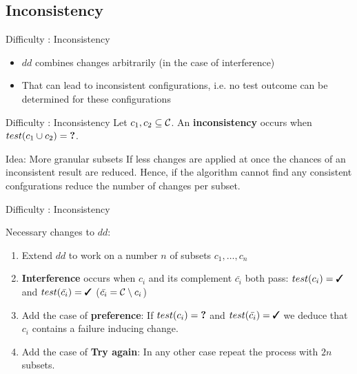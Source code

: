 \subsection{Inconsistency}
\begin{frame}{Difficulty : Inconsistency}
	\begin{itemize}
		\item $dd$ combines changes arbitrarily (in the case of interference)
		\item That can lead to inconsistent configurations, i.e. no test outcome can be determined for these configurations 
	\end{itemize}

	\begin{alertblock}{Difficulty : Inconsistency}
		Let $c_1,c_2 \subseteq \mathcal{C}$. An \textbf{inconsistency} occurs when $test(c_1 \cup c_2) = \textbf{?}$.
	\end{alertblock}
	\bigskip
	\begin{exampleblock}{Idea: More granular subsets}
		If less changes are applied at once the chances of an inconsistent result are reduced. Hence, if the algorithm cannot find any consistent confgurations reduce the number of changes per subset.
	\end{exampleblock}

\end{frame}

\begin{frame}{Difficulty : Inconsistency}
	
	Necessary changes to $dd$:
	\begin{enumerate}
		\item Extend $dd$ to work on a number $n$ of subsets $c_1, \dots, c_n$
		\item \textbf{Interference} occurs when $c_i$ and its complement $\bar{c_i}$ both pass: $test(c_i) = \cmark$ and $test(\bar{c_i}) = \cmark$ ($\bar{c_i}=\mathcal{C} \setminus c_i$)
		\item Add the case of \textbf{preference}: If $test(c_i)=\textbf{?}$ and $test(\bar{c_i})=\cmark$ we deduce that $c_i$ contains a failure inducing change. 
		\item Add the case of \textbf{Try again}: In any other case repeat the process with $2n$ subsets.
	\end{enumerate}
\end{frame}